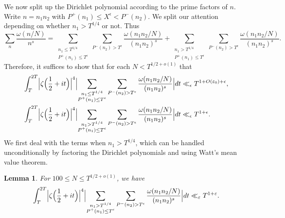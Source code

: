 \documentclass[12pt]{amsart}
\theoremstyle{plain}
\newtheorem{lemma}[theorem]{Lemma}
\theoremstyle{definition}
\theoremstyle{remark}
\begin{document}
We now split up the Dirichlet polynomial according to the prime factors of $n$. Write $n=n_1n_2$ with $P^+(n_1)\le X^\epsilon<P^-(n_2)$. We split our attention depending on whether $n_1>T^{1/4}$ or not. Thus
\[
\sum_{n}\frac{\omega(n/N)}{n^s}=\sum_{\substack{ n_1\le T^{1/4}\\ P^+(n_1)\le T^\epsilon}}\sum_{P^-(n_2)>T^\epsilon}\frac{\omega(n_1n_2/N)}{(n_1n_2)^s}+\sum_{\substack{ n_1>T^{1/4}\\ P^+(n_1)\le T^\epsilon}}\sum_{P^-(n_2)>T^\epsilon}\frac{\omega(n_1n_2/N)}{(n_1n_2)^s}.
\]
Therefore, it suffices to show that for each $N<T^{1/2+o(1)}$ that
\begin{align*}
\int_T^{2T} \Bigl| \zeta \Bigl(\frac{1}{2}+it \Bigr) \Bigr|^{4}\Bigl|\sum_{\substack{ n_1\le T^{1/4}\\ P^+(n_1)\le T^\epsilon}}\sum_{P^-(n_2)>T^\epsilon}\frac{\omega(n_1n_2/N)}{(n_1n_2)^s} \Bigr| dt& \ll_\epsilon T^{1+O(\varepsilon_0)+\epsilon},\\
\int_T^{2T} \Bigl| \zeta \Bigl(\frac{1}{2}+it \Bigr) \Bigr|^{4}\Bigl|\sum_{\substack{ n_1>T^{1/4}\\ P^+(n_1)\le T^\epsilon}}\sum_{P^-(n_2)>T^\epsilon}\frac{\omega(n_1n_2/N)}{(n_1n_2)^s} \Bigr| dt &\ll_\epsilon T^{1+\epsilon}.
\end{align*}
We first deal with the terms when $n_1>T^{1/4}$, which can be handled unconditionally by factoring the Dirichlet polynomials and using Watt's mean value theorem.
%
%
%
%
\begin{lemma}
For $100\leq N\le T^{1/2+o(1)}$, we have
\[
\int_T^{2T} \Bigl| \zeta \Bigl(\frac{1}{2}+it \Bigr) \Bigr|^{4}\Bigl|\sum_{\substack{ n_1>T^{1/4}\\ P^+(n_1)\le T^\epsilon}}\sum_{P^-(n_2)>T^\epsilon}\frac{\omega(n_1n_2/N)}{(n_1n_2)^s} \Bigr| dt \ll_\varepsilon T^{1+\varepsilon}.
\]
\end{lemma}
%
%
%
%
\end{document}
